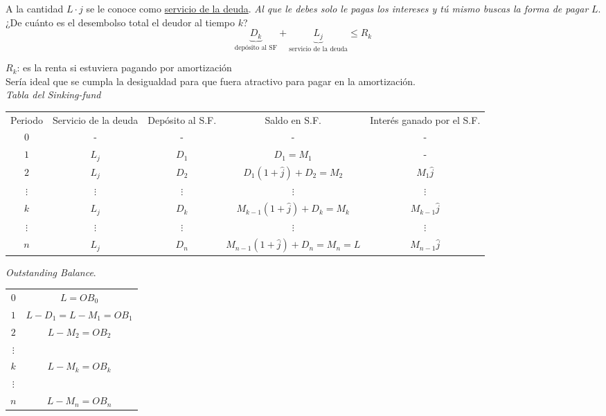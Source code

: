 A la cantidad $L\cdot j$ se le conoce como \underline{servicio de la deuda}. \textit{Al que le debes solo le pagas los intereses y tú mismo buscas la forma de pagar }$L$.\\

¿De cuánto es el desembolso total el deudor al tiempo $k$?\\
$$\underbrace{D_k}_{\text{depósito al SF}} + \underbrace{L_j}_{\text{servicio de la deuda}} \leq R_k$$

$R_k$: es la renta si estuviera pagando por amortización\\
Sería ideal que se cumpla la desigualdad para que fuera atractivo para pagar en la amortización.\\

\textit{Tabla del Sinking-fund}
\begin{table}[H]
\begin{tabular}{c|c|c|c|c}
Periodo  & Servicio de la deuda & Depósito al S.F. & Saldo en S.F.  & Interés ganado por el S.F. \\ $0$      & -       & -   & -   & -   \\ $1$      & $L_j$     & $D_1$            & $D_1=M_1$        & -    \\
$2$      & $L_j$     & $D_2$  & $D_1(1+\hat{j}) + D_2 = M_2$        & $M_1\hat{j}$     \\
$\vdots$ & $\vdots$    & $\vdots$ & $\vdots$   & $\vdots$ \\ $k$  & $L_j$ & $D_k$    & $M_{k-1}(1+\hat{j})+ D_k = M_k$     & $M_{k-1}\hat{j}$   \\ $\vdots$ & $\vdots$   & $\vdots$ & $\vdots$    & $\vdots$  \\ $n$ & $L_j$ & $D_n$  & $M_{n-1}(1+\hat{j}) + D_n = M_n =L$ & $M_{n-1}\hat{j}$  
\end{tabular}
\end{table}

\textit{Outstanding Balance}.
\begin{table}[H]
\begin{tabular}{cc}
$0$ & $L = OB_0$ \\
$1$     & $L-D_1=L-M_1 = OB_1$ \\
$2$     & $L-M_2=OB_2$ \\
$\vdots$ & \\
$k$     & $L-M_k=OB_k$ \\
$\vdots$ & \\
$n$     & $L-M_n=OB_n$ 
\end{tabular}
\end{table}

